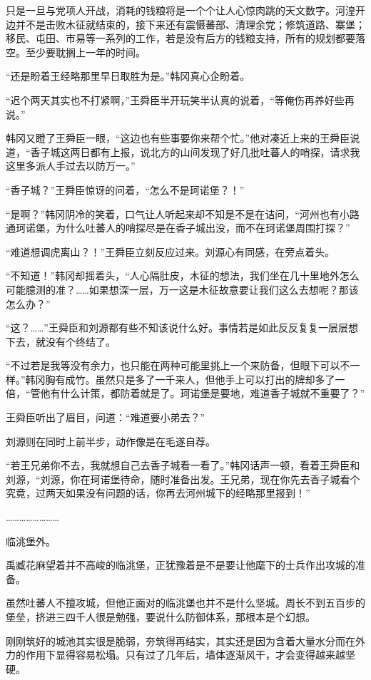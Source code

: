 只是一旦与党项人开战，消耗的钱粮将是一个个让人心惊肉跳的天文数字。河湟开边并不是击败木征就结束的，接下来还有震慑蕃部、清理余党；修筑道路、寨堡；移民、屯田、市易等一系列的工作，若是没有后方的钱粮支持，所有的规划都要落空。至少要耽搁上一年的时间。

“还是盼着王经略那里早日取胜为是。”韩冈真心企盼着。

“迟个两天其实也不打紧啊，”王舜臣半开玩笑半认真的说着，“等俺伤再养好些再说。”

韩冈又瞪了王舜臣一眼，“这边也有些事要你来帮个忙。”他对凑近上来的王舜臣说道，“香子城这两日都有上报，说北方的山间发现了好几批吐蕃人的哨探，请求我这里多派人手过去以防万一。”

“香子城？”王舜臣惊讶的问着，“怎么不是珂诺堡？！”

“是啊？”韩冈阴冷的笑着，口气让人听起来却不知是不是在诘问，“河州也有小路通珂诺堡，为什么吐蕃人的哨探尽是在香子城出没，而不在珂诺堡周围打探？”

“难道想调虎离山？！”王舜臣立刻反应过来。刘源心有同感，在旁点着头。

“不知道！”韩冈却摇着头，“人心隔肚皮，木征的想法，我们坐在几十里地外怎么可能臆测的准？……如果想深一层，万一这是木征故意要让我们这么去想呢？那该怎么办？”

“这？……”王舜臣和刘源都有些不知该说什么好。事情若是如此反反复复一层层想下去，就没有个终结了。

“不过若是我等没有余力，也只能在两种可能里挑上一个来防备，但眼下可以不一样。”韩冈胸有成竹。虽然只是多了一千来人，但他手上可以打出的牌却多了一倍，“管他有什么计策，都防着就是了。珂诺堡是要地，难道香子城就不重要了？”

王舜臣听出了眉目，问道：“难道要小弟去？”

刘源则在同时上前半步，动作像是在毛遂自荐。

“若王兄弟你不去，我就想自己去香子城看一看了。”韩冈话声一顿，看着王舜臣和刘源，“刘源，你在珂诺堡待命，随时准备出发。王兄弟，现在你先去香子城看个究竟，过两天如果没有问题的话，你再去河州城下的经略那里报到！”

……………………

临洮堡外。

禹臧花麻望着并不高峻的临洮堡，正犹豫着是不是要让他麾下的士兵作出攻城的准备。

虽然吐蕃人不擅攻城，但他正面对的临洮堡也并不是什么坚城。周长不到五百步的堡垒，挤进三四千人很是勉强，要说什么防御体系，那根本是个幻想。

刚刚筑好的城池其实很是脆弱，夯筑得再结实，其实还是因为含着大量水分而在外力的作用下显得容易松塌。只有过了几年后，墙体逐渐风干，才会变得越来越坚硬。

